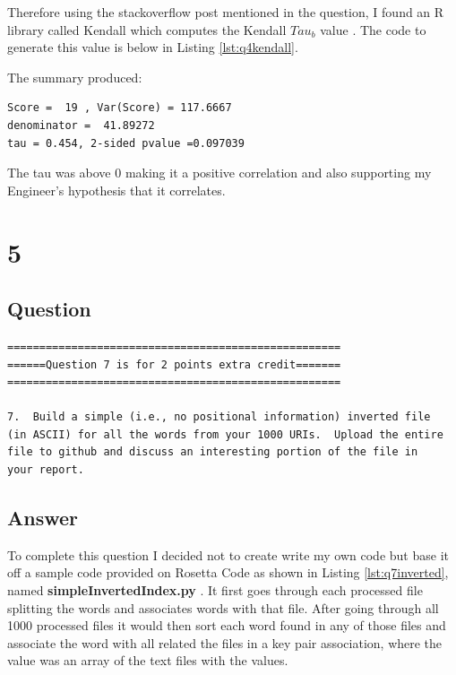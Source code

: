 \documentclass[letterpaper,11pt]{article}
\newcommand*{\srcPath}{../src}%
\begin{document}
Therefore using the stackoverflow post mentioned in the question, I found an R library called Kendall which computes the Kendall $Tau_b$ value \cite{stackoverflowpostref}. The code to generate this value is below in Listing \ref{lst:q4kendall}.



The summary produced:
\begin{verbatim}
Score =  19 , Var(Score) = 117.6667
denominator =  41.89272
tau = 0.454, 2-sided pvalue =0.097039
\end{verbatim}

The tau was above 0 making it a positive correlation and also supporting my Engineer's hypothesis that it correlates.


\clearpage
\section*{5}

\subsection*{Question}

\begin{verbatim}
====================================================
======Question 7 is for 2 points extra credit=======
====================================================

7.  Build a simple (i.e., no positional information) inverted file
(in ASCII) for all the words from your 1000 URIs.  Upload the entire
file to github and discuss an interesting portion of the file in
your report.
\end{verbatim}

\clearpage
\subsection*{Answer}

To complete this question I decided not to create write my own code but base it off a sample code provided on Rosetta Code as shown in Listing \ref{lst:q7inverted}, named \textbf{simpleInvertedIndex.py} \cite{invertedindexref}. It first goes through each processed file splitting the words and associates words with that file. After going through all 1000 processed files it would then sort each word found in any of those files and associate the word with all related the files in a key pair association, where the value was an array of the text files with the values.
\end{document}
